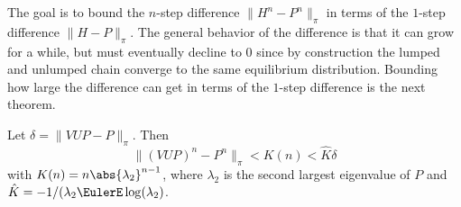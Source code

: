 \documentclass[12pt]{article}
\begin{document}
\begin{example}
The goal is to bound the $n$-step difference $\| H^n - P^n \|_{\pi}$ in
terms of the $1$-step difference $\| H - P\|_{\pi}$.  The general
behavior of the difference  is that it can grow for a while, but must
eventually decline to $0$ since by construction the lumped and
unlumped chain converge to the same equilibrium distribution.
Bounding how large the difference can get in terms of the $1$-step
difference is the next theorem.

\begin{theorem}
  Let $ \delta = \| VUP - P \|_{\pi}$.  Then
  \[
    \| (VUP)^n - P^n \|_{\pi} < K(n) < \hat{K} \delta
  \]
  with $K(n) = n \abs{\lambda_2}^{n-1}$, where $\lambda_2$ is the
  second largest eigenvalue of $P$ and $\hat{K} = -1/(\lambda_2
  \EulerE \log(\lambda_2)$.
\end{theorem}


\end{example}
\end{document}
